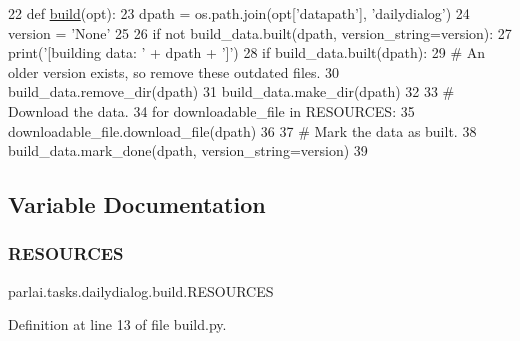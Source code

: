 \begin{DoxyCode}
22 \textcolor{keyword}{def }\hyperlink{namespacedialog__babi__feedback_1_1build_a7a9d289f7493a5ded13c4b7f071b6184}{build}(opt):
23     dpath = os.path.join(opt[\textcolor{stringliteral}{'datapath'}], \textcolor{stringliteral}{'dailydialog'})
24     version = \textcolor{stringliteral}{'None'}
25 
26     \textcolor{keywordflow}{if} \textcolor{keywordflow}{not} build\_data.built(dpath, version\_string=version):
27         print(\textcolor{stringliteral}{'[building data: '} + dpath + \textcolor{stringliteral}{']'})
28         \textcolor{keywordflow}{if} build\_data.built(dpath):
29             \textcolor{comment}{# An older version exists, so remove these outdated files.}
30             build\_data.remove\_dir(dpath)
31         build\_data.make\_dir(dpath)
32 
33         \textcolor{comment}{# Download the data.}
34         \textcolor{keywordflow}{for} downloadable\_file \textcolor{keywordflow}{in} RESOURCES:
35             downloadable\_file.download\_file(dpath)
36 
37         \textcolor{comment}{# Mark the data as built.}
38         build\_data.mark\_done(dpath, version\_string=version)
39 \end{DoxyCode}


\subsection{Variable Documentation}
\mbox{\label{namespaceparlai_1_1tasks_1_1dailydialog_1_1build_a1658349174300a749db82805418b23b8}} 
\subsubsection{\texorpdfstring{R\+E\+S\+O\+U\+R\+C\+ES}{RESOURCES}}
{\footnotesize\ttfamily parlai.\+tasks.\+dailydialog.\+build.\+R\+E\+S\+O\+U\+R\+C\+ES}



Definition at line 13 of file build.\+py.

